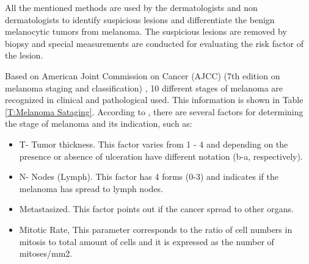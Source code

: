 All the mentioned methods are used by the dermatologists and non dermatologists to identify suspicious lesions and differentiate the benign melanocytic tumors from melanoma. The suspicious lesions are removed by biopsy and special measurements are conducted for evaluating the risk factor of the lesion.


 Based on American Joint Commission on Cancer (AJCC) (7th edition on melanoma staging and classification) \cite{balch2009final}, 10 different stages of melanoma are recognized in clinical and pathological used. This information is shown in Table \ref{T:Melanoma Sataging}. According to \cite{balch2009final}, there are several factors for determining the stage of melanoma and its indication, such as: 
	\begin{itemize}
	\item T- Tumor thickness. This factor varies from 1 - 4 and depending on the presence or absence of ulceration have different notation (b-a, respectively).
	\item N- Nodes (Lymph). This factor has 4 forms (0-3) and indicates if the melanoma has spread to lymph nodes.
	\item Metastasized. This factor points out if the cancer spread to other organs.
	\item Mitotic Rate, This parameter corresponds to the ratio of cell numbers in mitosis to total amount of cells and it is expressed as the number of mitoses/mm2.  
	\end{itemize}


